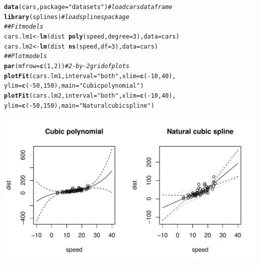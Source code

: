 \documentclass[cmfont,usenames,dvipsnames,leqno]{afit-etd}\usepackage[]{graphicx}\usepackage[]{color}
\makeatletter
\def\maxwidth{ %
  \ifdim\Gin@nat@width>\linewidth
    \linewidth
  \else
    \Gin@nat@width
  \fi
}
\newcommand{\hlnum}[1]{\textcolor[rgb]{0.686,0.059,0.569}{#1}}%
\newcommand{\hlstr}[1]{\textcolor[rgb]{0.192,0.494,0.8}{#1}}%
\newcommand{\hlcom}[1]{\textcolor[rgb]{0.678,0.584,0.686}{\textit{#1}}}%
\newcommand{\hlopt}[1]{\textcolor[rgb]{0,0,0}{#1}}%
\newcommand{\hlstd}[1]{\textcolor[rgb]{0.345,0.345,0.345}{#1}}%
\newcommand{\hlkwb}[1]{\textcolor[rgb]{0.69,0.353,0.396}{#1}}%
\newcommand{\hlkwc}[1]{\textcolor[rgb]{0.333,0.667,0.333}{#1}}%
\newcommand{\hlkwd}[1]{\textcolor[rgb]{0.737,0.353,0.396}{\textbf{#1}}}%
\newenvironment{kframe}{%
 \def\at@end@of@kframe{}%
 \ifinner\ifhmode%
  \def\at@end@of@kframe{\end{minipage}}%
  \begin{minipage}{\columnwidth}%
 \fi\fi%
 \def\FrameCommand##1{\hskip\@totalleftmargin \hskip-\fboxsep
 \colorbox{shadecolor}{##1}\hskip-\fboxsep
     \hskip-\linewidth \hskip-\@totalleftmargin \hskip\columnwidth}%
 \MakeFramed {\advance\hsize-\width
   \@totalleftmargin\z@ \linewidth\hsize
   \@setminipage}}%
 {\par\unskip\endMakeFramed%
 \at@end@of@kframe}
\newenvironment{knitrout}{}{} %
\renewenvironment{knitrout}{\begin{singlespace}}{\end{singlespace}}
\makeatother
\begin{document}
\begin{knitrout}
\color{fgcolor}\begin{kframe}
\begin{alltt}
\hlkwd{data}\hlstd{(cars,} \hlkwc{package} \hlstd{=} \hlstr{"datasets"}\hlstd{)}  \hlcom{# load cars data frame}
\hlkwd{library}\hlstd{(splines)}  \hlcom{# load splines package}
\hlcom{## Fit models}
\hlstd{cars.lm1} \hlkwb{<-} \hlkwd{lm}\hlstd{(dist} \hlopt{~} \hlkwd{poly}\hlstd{(speed,} \hlkwc{degree} \hlstd{=} \hlnum{3}\hlstd{),} \hlkwc{data} \hlstd{= cars)}
\hlstd{cars.lm2} \hlkwb{<-} \hlkwd{lm}\hlstd{(dist} \hlopt{~} \hlkwd{ns}\hlstd{(speed,} \hlkwc{df} \hlstd{=} \hlnum{3}\hlstd{),} \hlkwc{data} \hlstd{= cars)}
\hlcom{## Plot models}
\hlkwd{par}\hlstd{(}\hlkwc{mfrow} \hlstd{=} \hlkwd{c}\hlstd{(}\hlnum{1}\hlstd{,} \hlnum{2}\hlstd{))}  \hlcom{# 2-by-2 grid of plots}
\hlkwd{plotFit}\hlstd{(cars.lm1,} \hlkwc{interval} \hlstd{=} \hlstr{"both"}\hlstd{,} \hlkwc{xlim} \hlstd{=} \hlkwd{c}\hlstd{(}\hlopt{-}\hlnum{10}\hlstd{,} \hlnum{40}\hlstd{),}
    \hlkwc{ylim} \hlstd{=} \hlkwd{c}\hlstd{(}\hlopt{-}\hlnum{50}\hlstd{,} \hlnum{150}\hlstd{),} \hlkwc{main} \hlstd{=} \hlstr{"Cubic polynomial"}\hlstd{)}
\hlkwd{plotFit}\hlstd{(cars.lm2,} \hlkwc{interval} \hlstd{=} \hlstr{"both"}\hlstd{,} \hlkwc{xlim} \hlstd{=} \hlkwd{c}\hlstd{(}\hlopt{-}\hlnum{10}\hlstd{,} \hlnum{40}\hlstd{),}
    \hlkwc{ylim} \hlstd{=} \hlkwd{c}\hlstd{(}\hlopt{-}\hlnum{50}\hlstd{,} \hlnum{150}\hlstd{),} \hlkwc{main} \hlstd{=} \hlstr{"Natural cubic spline"}\hlstd{)}
\end{alltt}
\end{kframe}
\includegraphics[width=\maxwidth]{figure/example-cars-plotFit} 

\end{knitrout}
\end{document}
